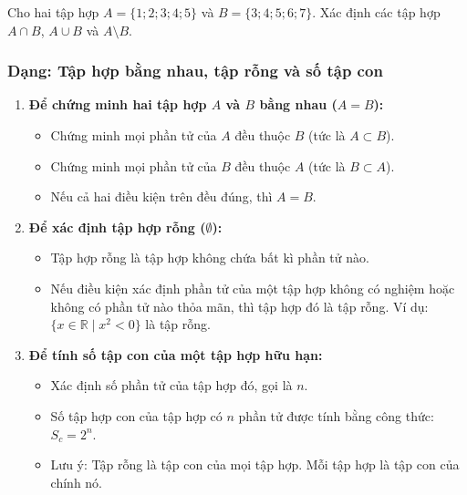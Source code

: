 \begin{vidumau}
Cho hai tập hợp $A = \{1; 2; 3; 4; 5\}$ và $B = \{3; 4; 5; 6; 7\}$. Xác định các tập hợp $A \cap B$, $A \cup B$ và $A \setminus B$.
\end{vidumau}\par



\subsubsection{Dạng: Tập hợp bằng nhau, tập rỗng và số tập con}
\begin{phuongphap}
\begin{enumerate}
\item \textbf{Để chứng minh hai tập hợp $A$ và $B$ bằng nhau ($A = B$):}
\begin{itemize}
    \item Chứng minh mọi phần tử của $A$ đều thuộc $B$ (tức là $A \subset B$).
    \item Chứng minh mọi phần tử của $B$ đều thuộc $A$ (tức là $B \subset A$).
    \item Nếu cả hai điều kiện trên đều đúng, thì $A = B$.
\end{itemize}
\item \textbf{Để xác định tập hợp rỗng ($\emptyset$):}
\begin{itemize}
    \item Tập hợp rỗng là tập hợp không chứa bất kì phần tử nào.
    \item Nếu điều kiện xác định phần tử của một tập hợp không có nghiệm hoặc không có phần tử nào thỏa mãn, thì tập hợp đó là tập rỗng. Ví dụ: $\{x \in \mathbb{R} \mid x^2 < 0\}$ là tập rỗng.
\end{itemize}
\item \textbf{Để tính số tập con của một tập hợp hữu hạn:}
\begin{itemize}
    \item Xác định số phần tử của tập hợp đó, gọi là $n$.
    \item Số tập hợp con của tập hợp có $n$ phần tử được tính bằng công thức: $S_c = 2^n$.
    \item Lưu ý: Tập rỗng là tập con của mọi tập hợp. Mỗi tập hợp là tập con của chính nó.
\end{itemize}
\end{enumerate}
\end{phuongphap}

